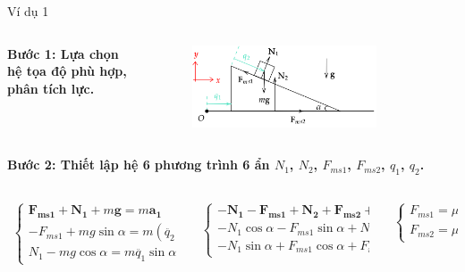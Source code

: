 \begin{frame}{Ví dụ 1}
\begin{columns}
    \begin{column}{0.5\textwidth}
\textbf{Bước 1: Lựa chọn hệ tọa độ phù hợp, phân tích lực.}
\end{column}
    \begin{column}{0.5\textwidth}
\begin{figure}
    \centering
    \includegraphics[width=0.8\textwidth]{Slides/Figure/wedgemass1.png}
\end{figure}
\end{column}
\end{columns}
\textbf{Bước 2: Thiết lập hệ 6 phương trình 6 ẩn \(N_1\), \(N_2\), \(F_{ms1}\), \(F_{ms2}\), \(q_1\), \(q_2\).}
\scriptsize
\begin{columns}
\begin{column}{0.4\textwidth}
\begin{align*}
    \begin{cases}
        \mathbf{F_{ms1}}+\mathbf{N_1}+m\mathbf{g}=m\mathbf{a_1} \\
        -F_{ms1}+mg\sin\alpha=m (\ddot{q_2}+\ddot{q_1}\cos\alpha) \\
        N_1-mg\cos\alpha=m\ddot{q_1}\sin\alpha
    \end{cases}
\end{align*}
\end{column}
\begin{column}{0.3\textwidth}
\begin{align*}
    \begin{cases}
        -\mathbf{N_1}-\mathbf{F_{ms1}}+\mathbf{N_2}+\mathbf{F_{ms2}}+M\mathbf{g}=M\mathbf{a_2}\\
        -N_1\cos\alpha-F_{ms1}\sin\alpha+N_2-Mg=0\\
        -N_1\sin\alpha+F_{ms1}\cos\alpha+F_{ms2}=M\ddot{q_1}
    \end{cases}
\end{align*}
\end{column}
\begin{column}{0.3\textwidth}
\begin{align*}
    \begin{cases}
        F_{ms1}=\mu_1 N_1 \\
        F_{ms2}=\mu_2 N_2
    \end{cases}
\end{align*}
\end{column}
\end{columns}
\normalsize
\end{frame}

